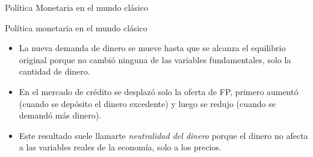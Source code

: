\documentclass{beamer}
\begin{document}
\begin{frame}{Política Monetaria en el mundo clásico}
\begin{itemize}
    \end{itemize}
\end{frame}


\begin{frame}{Política monetaria en el mundo clásico}
    \begin{itemize}
        \item La nueva demanda de dinero se mueve hasta que se alcanza el equilibrio original porque no cambió ninguna de las variables fundamentales, solo la cantidad de dinero.
        \item En el mercado de crédito se desplazó solo la oferta de FP, primero aumentó (cuando se depósito el dinero excedente) y luego se redujo (cuando se demandó más dinero).
        \item Este resultado suele llamarte \textit{neutralidad del dinero} porque el dinero no afecta a las variables reales de la economía, solo a los precios.
    \end{itemize}
\end{frame}
\end{document}
